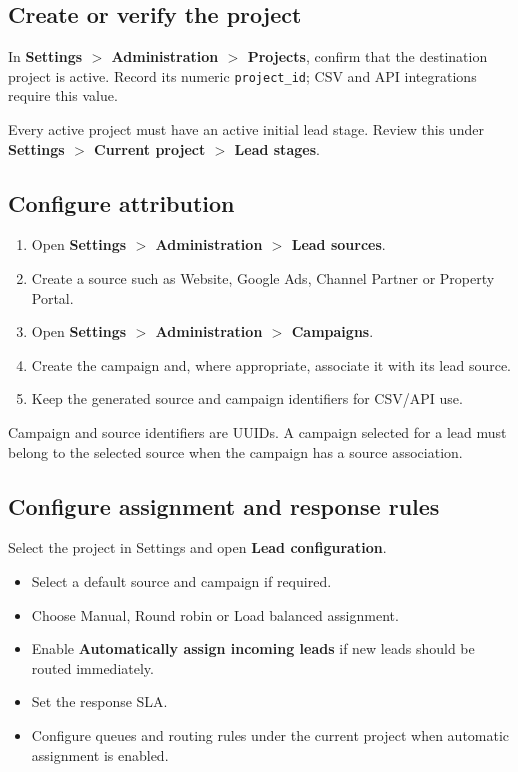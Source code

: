 \documentclass[11pt,a4paper]{article}
\newcommand{\menu}[1]{\textbf{#1}}
\newcommand{\code}[1]{\texttt{#1}}
\begin{document}
\subsection{Create or verify the project}

In \menu{Settings $>$ Administration $>$ Projects}, confirm that the destination project is active. Record its numeric \code{project\_id}; CSV and API integrations require this value.

Every active project must have an active initial lead stage. Review this under \menu{Settings $>$ Current project $>$ Lead stages}.

\subsection{Configure attribution}

\begin{enumerate}
  \item Open \menu{Settings $>$ Administration $>$ Lead sources}.
  \item Create a source such as Website, Google Ads, Channel Partner or Property Portal.
  \item Open \menu{Settings $>$ Administration $>$ Campaigns}.
  \item Create the campaign and, where appropriate, associate it with its lead source.
  \item Keep the generated source and campaign identifiers for CSV/API use.
\end{enumerate}

Campaign and source identifiers are UUIDs. A campaign selected for a lead must belong to the selected source when the campaign has a source association.

\subsection{Configure assignment and response rules}

Select the project in Settings and open \menu{Lead configuration}.

\begin{itemize}
  \item Select a default source and campaign if required.
  \item Choose Manual, Round robin or Load balanced assignment.
  \item Enable \menu{Automatically assign incoming leads} if new leads should be routed immediately.
  \item Set the response SLA.
  \item Configure queues and routing rules under the current project when automatic assignment is enabled.
\end{itemize}
\end{document}
